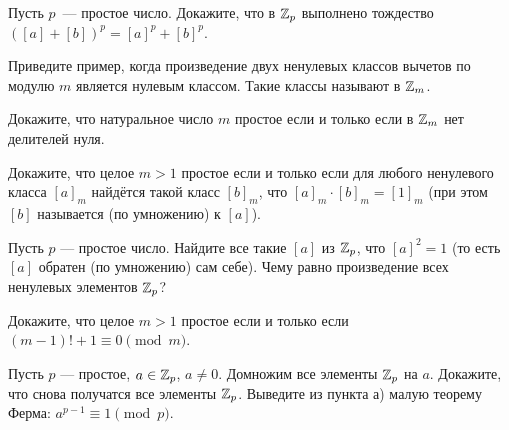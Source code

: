 \documentclass[a4paper, 11pt]{article}
\begin{document}
 Пусть $p$~--- простое число. Докажите, что
в $\mathbb{Z}_p$ выполнено тождество $([a] + [b])^p = [a]^p + [b]^p$. 


 Приведите пример, когда произведение двух ненулевых классов
вычетов по модулю $m$ является нулевым классом. Такие классы
называют  в $\mathbb{Z}_m$. 

 Докажите, что натуральное число $m$ простое если и только если
в $\mathbb{Z}_m$ нет делителей нуля. 

 Докажите, что целое $m > 1$ простое если и только если 
для любого ненулевого класса $[a]_m$ найдётся такой класс $[b]_m$, что $[a]_m\cdot[b]_m = [1]_m$ (при этом $[b]$ называется  (по умножению) к $[a]$).





Пусть $p$ --- простое число.
 Найдите все такие $[a]$ из $\mathbb{Z}_p$, что $[a]^2=1$
(то есть $[a]$ обратен (по умножению) сам себе).
 Чему равно произведение всех ненулевых элементов $\mathbb{Z}_p$?

Докажите, что целое $m>1 $ простое если и только если $(m-1)!+1\equiv0\!\pmod{m}$.

Пусть $p$ --- простое, $a\in\mathbb{Z}_p$, $a\ne0$.
Домножим все элементы $\mathbb{Z}_p$ на $a$. Докажите, что снова получатся
все элементы $\mathbb{Z}_p$.
Выведите из пункта а) малую теорему Ферма: $a^{p-1}\equiv1\!\pmod{p}$.
\end{document}
